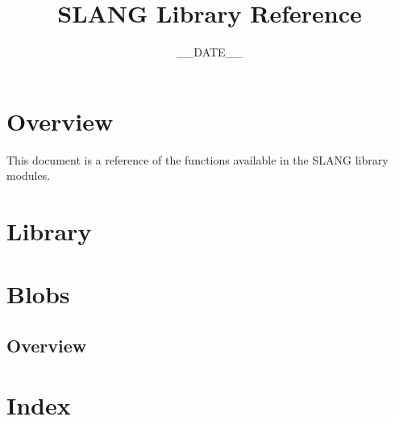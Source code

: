 \documentclass{article}
\title{SLANG Library Reference}
\date{__DATE__}
\begin{document}
\maketitle
\tableofcontents
\newpage

\section{Overview}

This document is a reference of the functions available in the SLANG library modules.

\section{Library}



\section{Blobs}

\subsection{Overview}

\section{Index}
\printindex
\end{document}
